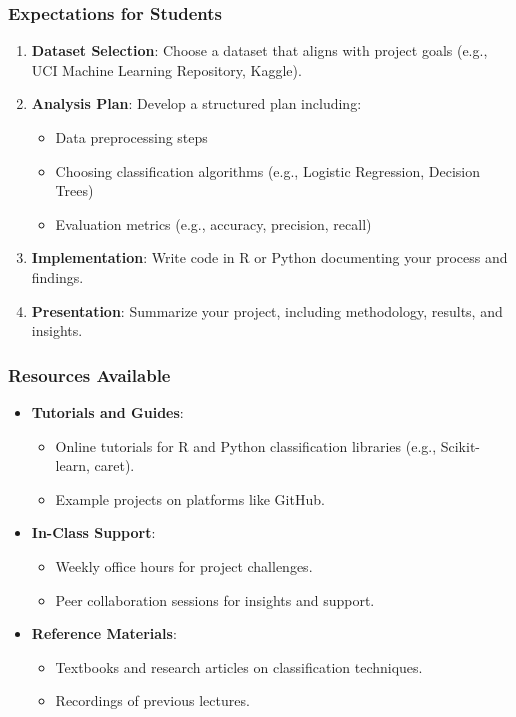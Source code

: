 \documentclass[aspectratio=169]{beamer}
\begin{document}
\begin{frame}[fragile]
    \frametitle{Expectations for Students}
    \begin{enumerate}
        \item \textbf{Dataset Selection}: Choose a dataset that aligns with project goals (e.g., UCI Machine Learning Repository, Kaggle).
        \item \textbf{Analysis Plan}: Develop a structured plan including:
        \begin{itemize}
            \item Data preprocessing steps
            \item Choosing classification algorithms (e.g., Logistic Regression, Decision Trees)
            \item Evaluation metrics (e.g., accuracy, precision, recall)
        \end{itemize}
        \item \textbf{Implementation}: Write code in R or Python documenting your process and findings.
        \item \textbf{Presentation}: Summarize your project, including methodology, results, and insights.
    \end{enumerate}
\end{frame}

\begin{frame}[fragile]
    \frametitle{Resources Available}
    \begin{itemize}
        \item \textbf{Tutorials and Guides}:
        \begin{itemize}
            \item Online tutorials for R and Python classification libraries (e.g., Scikit-learn, caret).
            \item Example projects on platforms like GitHub.
        \end{itemize}
        \item \textbf{In-Class Support}:
        \begin{itemize}
            \item Weekly office hours for project challenges.
            \item Peer collaboration sessions for insights and support.
        \end{itemize}
        \item \textbf{Reference Materials}:
        \begin{itemize}
            \item Textbooks and research articles on classification techniques.
            \item Recordings of previous lectures.
        \end{itemize}
    \end{itemize}
\end{frame}
\end{document}
